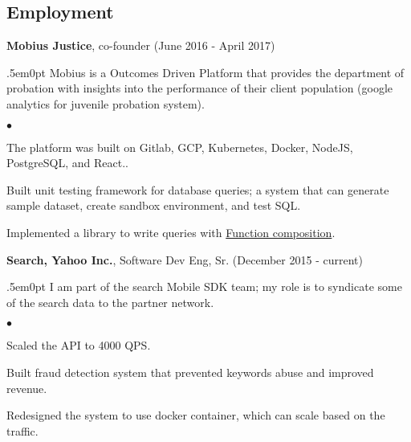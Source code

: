 \documentclass[margin, line, 10pt]{res}
\newenvironment{list2}{
  \begin{list}{$\bullet$}{%
      \setlength{\itemsep}{0in}
      \setlength{\parsep}{0in} \setlength{\parskip}{0in}
      \setlength{\topsep}{0in} \setlength{\partopsep}{0in}
      \setlength{\leftmargin}{0.2in}}}{\end{list}}
\begin{document}
\begin{resume}
\section{Employment}


\vspace{.05cm}

{\Large {\bf Mobius Justice}}, co-founder (June 2016 - April 2017)\\
\begin{adjustwidth}{.5em}{0pt}
  \vspace{-.1cm}
  Mobius is a Outcomes Driven Platform that provides the department of probation with insights
into the performance of their client population (google analytics for juvenile probation system).

  \begin{list2}
  \vspace{.2cm}
  \item The platform was built on Gitlab, GCP, Kubernetes, Docker, NodeJS, PostgreSQL, and React..
  \item Built unit testing framework for database queries; a system that can generate sample dataset, create sandbox environment, and test SQL.
  \item Implemented a library to write queries with \href{https://en.wikipedia.org/wiki/Function_composition_(computer_science)}{Function composition}.
  \end{list2}
  \vspace{.05cm}
\end{adjustwidth}

{\Large {\bf Search, Yahoo Inc.}}, Software Dev Eng, Sr. (December 2015 - current)\\
\begin{adjustwidth}{.5em}{0pt}
  \vspace{-.1cm}
  I am part of the search Mobile SDK team; my role is to syndicate some of the search data to the partner network.
  \begin{list2}
  \vspace{.2cm}
  \item Scaled the API to 4000 QPS.
  \item Built fraud detection system that prevented keywords abuse and improved revenue.
  \item Redesigned the system to use docker container, which can scale based on the traffic.
  \end{list2}
  \vspace{.05cm}
\end{adjustwidth}


\end{resume}
\end{document}
